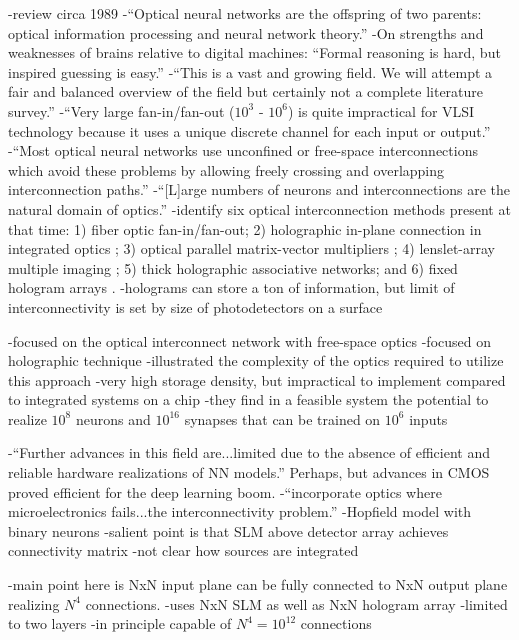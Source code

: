 \cite{caki1989}
-review circa 1989
-``Optical neural networks are the offspring of two parents: optical information processing and neural network theory.''
-On strengths and weaknesses of brains relative to digital machines: ``Formal reasoning is hard, but inspired guessing is easy.''
-``This is a vast and growing field. We will attempt a fair and balanced overview of the field but certainly not a complete literature survey.''
-``Very large fan-in/fan-out ($10^3$ - $10^6$) is quite impractical for VLSI technology because it uses a unique discrete channel for each input or output.''
-``Most optical neural networks use unconfined or free-space interconnections which avoid these problems by allowing freely crossing and overlapping interconnection paths.''
-``[L]arge numbers of neurons and interconnections are the natural domain of optics.'' 
-identify six optical interconnection methods present at that time: 1) fiber optic fan-in/fan-out; 2) holographic in-plane connection in integrated optics \cite{fees1988}; 3) optical parallel matrix-vector multipliers \cite{faps1985}; 4) lenslet-array multiple imaging \cite{fami1986}; 5) thick holographic associative networks; and 6) fixed hologram arrays \cite{ca1987}.
-holograms can store a ton of information, but limit of interconnectivity is set by size of photodetectors on a surface

\cite{jast1986}
-focused on the optical interconnect network with free-space optics
-focused on holographic technique
-illustrated the complexity of the optics required to utilize this approach 
-very high storage density, but impractical to implement compared to integrated systems on a chip
-they find in a feasible system the potential to realize $10^8$ neurons and $10^{16}$ synapses that can be trained on $10^6$ inputs

\cite{agne1988}
-``Further advances in this field are...limited due to the absence of efficient and reliable hardware realizations of NN models.'' Perhaps, but advances in CMOS proved efficient for the deep learning boom.
-``incorporate optics where microelectronics fails...the interconnectivity problem.''
-Hopfield model with binary neurons
-salient point is that SLM above detector array achieves connectivity matrix
-not clear how sources are integrated

\cite{ca1987}
-main point here is NxN input plane can be fully connected to NxN output plane realizing $N^4$ connections.
-uses NxN SLM as well as NxN hologram array
-limited to two layers
-in principle capable of $N^4 = 10^{12}$ connections

